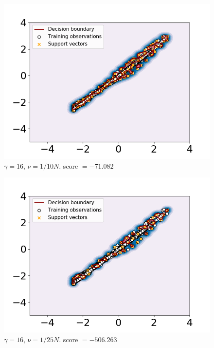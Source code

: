     
    \begin{figure}
        \centering
        \includegraphics[width = .7\textwidth]{report/figures/analysis/gridsearch/Novelty detection, -2 training, gamma = 16 nu = 1.0583130489998942e-05.png}
        \caption{$\gamma = 16$, $\nu = 1/10N$. score $=-71.082$}
        \label{fig:my_label}
    \end{figure}
    
    
    \begin{figure}
        \centering
        \includegraphics[width = .7\textwidth]{report/figures/analysis/gridsearch/Novelty detection, -1 training, gamma = 16 nu = 4.233252195999577e-06.png}
        \caption{$\gamma = 16$, $\nu = 1/25N$. score $=-506.263$}
        \label{fig:my_label}
    \end{figure}

